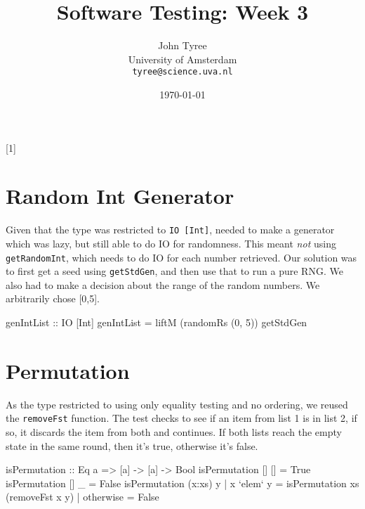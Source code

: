 \documentclass[a4paper,10pt]{article}
\title{Software Testing: Week 3}
\author{John Tyree\\
University of Amsterdam\\
\texttt{tyree@science.uva.nl}}
\date{\today}
\begin{document}
\maketitle

\setcounter{section}[1]
\section{Random Int Generator}

Given that the type was restricted to \texttt{IO [Int]}, needed to make a generator which was lazy, but still able to do IO for randomness. This meant \emph{not} using \texttt{getRandomInt}, which needs to do IO for each number retrieved. Our solution was to first get a seed using \texttt{getStdGen}, and then use that to run a pure RNG. We also had to make a decision about the range of the random numbers. We arbitrarily chose [0,5].

\begin{code}
genIntList :: IO [Int]
genIntList = liftM (randomRs (0, 5)) getStdGen
\end{code}


\section{Permutation}

As the type restricted to using only equality testing and no ordering, we reused the \texttt{removeFst} function. The test checks to see if an item from list 1 is in list 2, if so, it discards the item from both and continues. If both lists reach the empty state in the same round, then it's true, otherwise it's false.

\begin{code}
isPermutation :: Eq a => [a] -> [a] -> Bool
isPermutation [] [] = True
isPermutation [] _  = False
isPermutation (x:xs) y
    | x `elem` y = isPermutation xs (removeFst x y)
    | otherwise  = False
\end{code}
\end{document}
